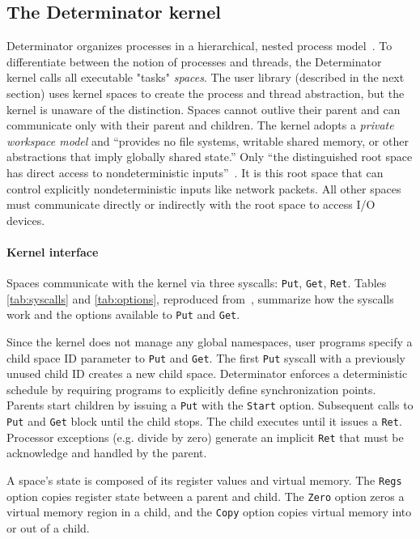 \subsection{The Determinator kernel}

Determinator organizes processes in a hierarchical, nested
process model~\cite{Ford96,Aviram10}. To differentiate between the notion of
processes and threads, the Determinator kernel calls all executable "tasks"
\emph{spaces}. The user library (described in the next section) uses kernel
spaces to create the process and thread abstraction, but the kernel is unaware
of the distinction.
Spaces cannot outlive their parent and can communicate only with their
parent and children. The kernel adopts a \emph{private workspace model} and
``provides no file systems, writable shared
memory, or other abstractions that imply globally shared state.'' Only ``the
distinguished root space has direct access to nondeterministic
inputs''~\cite{Aviram10}. It is this root space that can control explicitly
nondeterministic inputs like network packets. All other spaces must
communicate directly or indirectly with the root space to access I/O devices.




\paragraph{Kernel interface} Spaces communicate with the kernel via three
syscalls: {\tt Put}, {\tt Get}, {\tt Ret}. Tables \ref{tab:syscalls} and
\ref{tab:options}, reproduced from~\cite{Aviram10}, summarize how the syscalls
work and the options available to {\tt Put} and {\tt Get}.

Since the kernel does not manage any global namespaces, user programs specify
a child space ID parameter to {\tt Put} and {\tt Get}. The first {\tt Put}
syscall with a previously unused child ID creates a new child space.
Determinator enforces a deterministic schedule by requiring programs to
explicitly define synchronization points. Parents start children by issuing a
{\tt Put} with the {\tt Start} option. Subsequent calls to {\tt Put} and
{\tt Get} block until the child stops. The child executes until it issues a
{\tt Ret}. Processor exceptions (e.g. divide by zero) generate an implicit
{\tt Ret} that must be acknowledge and handled by the parent.

A space's state is composed of its register values and virtual memory.
The {\tt Regs} option copies register state between a parent and child.
The {\tt Zero} option zeros a virtual memory region in a child, and the
{\tt Copy} option copies virtual memory into or out of a child.

